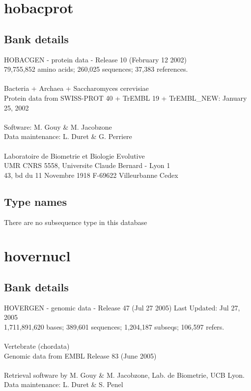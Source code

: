 \documentclass{article}
\begin{document}
\begin{Schunk}
\section{ hobacprot }
\subsection{Bank details}
HOBACGEN - protein data - Release 10 (February 12 2002)\\
79,755,852 amino acids; 260,025 sequences; 37,383 references.\\
\\
Bacteria + Archaea + Saccharomyces cerevisiae\\
Protein data from SWISS-PROT 40 + TrEMBL 19 + TrEMBL\_NEW: January 25, 2002\\
\\
Software: M. Gouy \& M. Jacobzone\\
Data maintenance: L. Duret \& G. Perriere\\
\\
Laboratoire de Biometrie et Biologie Evolutive\\
UMR CNRS 5558, Universite Claude Bernard - Lyon 1\\
43, bd du 11 Novembre 1918 F-69622 Villeurbanne Cedex\\


\subsection{Type names}
There are no subsequence type in this database
\section{ hovernucl }
\subsection{Bank details}
HOVERGEN - genomic data - Release 47 (Jul 27 2005) Last Updated: Jul 27, 2005\\
1,711,891,620 bases; 389,601 sequences; 1,204,187 subseqs; 106,597 refers.\\
\\
Vertebrate (chordata)\\
Genomic data from EMBL Release 83  (June 2005)\\
\\
Retrieval software by M. Gouy \& M. Jacobzone, Lab. de Biometrie, UCB Lyon.\\
Data maintenance: L. Duret \& S. Penel\\



\end{Schunk}
\end{document}
